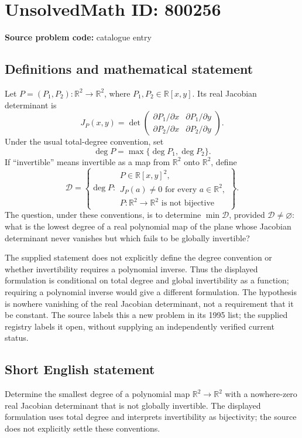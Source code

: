 \documentclass[11pt]{article}
\newcommand{\R}{\mathbb{R}}
\begin{document}
\section*{UnsolvedMath ID: 800256}
\textbf{Source problem code:} catalogue entry
\subsection{Definitions and mathematical statement}
Let \(P=(P_1,P_2):\R^2\to\R^2\), where \(P_1,P_2\in\R[x,y]\). Its real Jacobian determinant is
\[
J_P(x,y)=\det\begin{pmatrix}
\partial P_1/\partial x & \partial P_1/\partial y\\
\partial P_2/\partial x & \partial P_2/\partial y
\end{pmatrix}.
\]
Under the usual total-degree convention, set
\[
\deg P=\max\{\deg P_1,\deg P_2\}.
\]
If ``invertible'' means invertible as a map from \(\R^2\) onto \(\R^2\), define
\[
\mathcal D=\left\{\deg P:\begin{array}{l}
P\in\R[x,y]^2,\\
J_P(a)\ne0\text{ for every }a\in\R^2,\\
P:\R^2\to\R^2\text{ is not bijective}
\end{array}\right\}.
\]
The question, under these conventions, is to determine \(\min\mathcal D\), provided \(\mathcal D\ne\varnothing\): what is the lowest degree of a real polynomial map of the plane whose Jacobian determinant never vanishes but which fails to be globally invertible?

The supplied statement does not explicitly define the degree convention or whether invertibility requires a polynomial inverse. Thus the displayed formulation is conditional on total degree and global invertibility as a function; requiring a polynomial inverse would give a different formulation. The hypothesis is nowhere vanishing of the real Jacobian determinant, not a requirement that it be constant. The source labels this a new problem in its 1995 list; the supplied registry labels it open, without supplying an independently verified current status.
\subsection{Short English statement}
Determine the smallest degree of a polynomial map \(\R^2\to\R^2\) with a nowhere-zero real Jacobian determinant that is not globally invertible. The displayed formulation uses total degree and interprets invertibility as bijectivity; the source does not explicitly settle these conventions.
\end{document}
